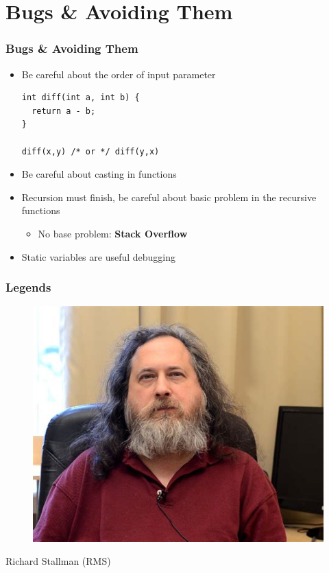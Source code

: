 \documentclass{../c-lecture}
\begin{document}
\section{Bugs \& Avoiding Them}

\begin{frame}[fragile]
  \frametitle{Bugs \& Avoiding Them}
  \begin{itemize}
    \item Be careful about the order of input parameter
    \begin{verbatim}
int diff(int a, int b) {
  return a - b;
}

diff(x,y) /* or */ diff(y,x)
    \end{verbatim}
    \item Be careful about casting in functions
    \item
      Recursion must finish, be careful about basic problem in the recursive
      functions
    \begin{itemize}
      \item
        No base problem: \textbf{\color{YellowOrange} Stack Overflow}
    \end{itemize}
    \item Static variables are useful debugging
  \end{itemize}
\end{frame}

\begin{frame}
  \frametitle{Legends}
  \begin{figure}
    \includegraphics[height=.75\textheight]{./img/stallman.jpg}
  \end{figure}
  \pause%
  \centering
  \color{Violet} Richard Stallman (RMS)
\end{frame}
\end{document}
